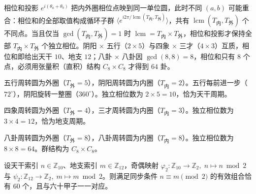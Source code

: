 \begin{remark}[周转圆嵌套的相位和与张量积边界]\label{ch20_epicycle_gcd_boundary}
相位和投影 $e^{i(\theta_a + \theta_b)}$ 把内外圈相位点映到同一单位圆，此时不同 $(a,b)$ 可能重合：相位和的全部取值构成循环子群 $\langle e^{i2\pi/\operatorname{lcm}(T_{\text{内}},T_{\text{外}})}\rangle$，共有 $\operatorname{lcm}(T_{\text{内}}, T_{\text{外}})$ 个不同点。当且仅当 $\gcd(T_{\text{内}}, T_{\text{外}}) = 1$ 时 $\operatorname{lcm} = T_{\text{内}} \times T_{\text{外}}$，相位和投影才保持全部 $T_{\text{内}} \times T_{\text{外}}$ 个独立相位。阴阳 $\times$ 五行（$2 \times 5$）与四象 $\times$ 三才（$4 \times 3$）互质，相位和即给出天干 $10$、地支 $12$；八卦 $\times$ 八卦因 $\gcd(8,8) = 8$，相位和只有 $8$ 个点，必须用张量积（直积）结构 $C_8 \times C_8$ 才得到 $64$ 卦。
\end{remark}

\begin{example}[天干的周转圆生成]\label{ex:tiangan_generation}
五行周转圆为外圈（$T_{\text{外}} = 5$），阴阳周转圆为内圈（$T_{\text{内}} = 2$）。五行每前进一步（$72^\circ$），阴阳旋转一整圈（$360^\circ$）。独立相位数为 $2 \times 5 = 10$，恰为天干周期。
\end{example}

\begin{example}[地支的周转圆生成]\label{ex:dizhi_generation}
四象周转圆为外圈（$T_{\text{外}} = 4$），三才周转圆为内圈（$T_{\text{内}} = 3$）。独立相位数为 $3 \times 4 = 12$，恰为地支周期。
\end{example}

\begin{example}[六十四卦的周转圆生成]\label{ex:liushisigua_generation}
八卦周转圆为外圈（$T_{\text{外}} = 8$），八卦周转圆为内圈（$T_{\text{内}} = 8$）。独立相位数为 $8 \times 8 = 64$。群结构为 $C_8 \times C_8$。
\end{example}

\begin{lemma}[六十甲子的奇偶筛选]\label{ch20_ganzhi_parity_filter}
设天干索引 $n \in \mathbb{Z}_{10}$、地支索引 $m \in \mathbb{Z}_{12}$，奇偶映射 $\varphi_2: \mathbb{Z}_{10} \to \mathbb{Z}_2,\; n \mapsto n \bmod 2$ 与 $\psi_2: \mathbb{Z}_{12} \to \mathbb{Z}_2,\; m \mapsto m \bmod 2$。则满足同步条件 $n \equiv m \pmod 2$ 的有效组合恰有 $60$ 个，且与六十甲子一一对应。
\end{lemma}

